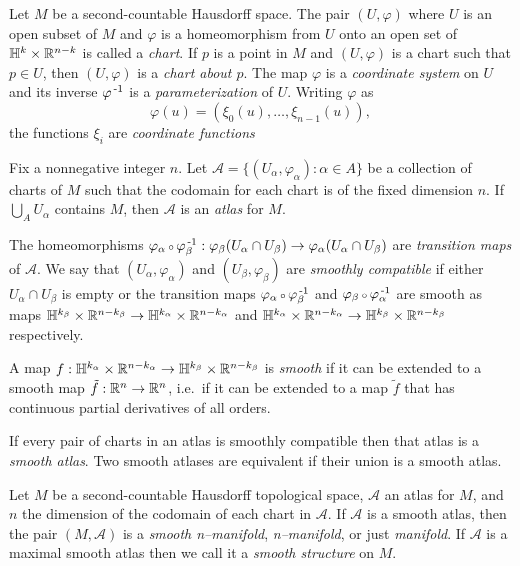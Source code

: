\begin{defn}[Coordinates]
	\label{def:coordinates}
	Let $M$ be a second-countable Hausdorff space.
	The pair $(U,\varphi)$ where $U$ is an open subset of $M$ and $\varphi$ is a homeomorphism from $U$ onto an open set of $\mathbb{H}^k\times\mathbb{R}^{n-k}$ is called a \emph{chart}.
	If $p$ is a point in $M$ and $(U,\varphi)$ is a chart such that $p\in U$, then $(U,\varphi)$ is a \emph{chart about $p$}.
	The map $\varphi$ is a \emph{coordinate system} on $U$ and its inverse $\varphi^{\,\text{-}1}$ is a \emph{parameterization} of $U$.
	Writing $\varphi$ as
	\[
		\varphi(u) = (\xi_0(u),\dots,\xi_{n-1}(u)),
	\]
	the functions $\xi_i$ are \emph{coordinate functions}	
\end{defn}

\begin{defn}[Atlas]
	\label{def:atlas}
	Fix a nonnegative integer $n$.
	Let $\mathcal{A}=\{(U_\alpha,\varphi_\alpha):\alpha\in A\}$ be a collection of charts of $M$ such that the codomain for each chart is of the fixed dimension $n$.
	If $\bigcup_A U_\alpha$ contains $M$, then $\mathcal{A}$ is an \emph{atlas} for $M$.
	
	The homeomorphisms $\varphi_\alpha\comp \varphi_\beta\inv:\varphi_\beta(U_\alpha\cap U_\beta)\to \varphi_\alpha(U_\alpha\cap U_\beta)$ are \emph{transition maps} of $\mathcal{A}$.
	We say that $(U_\alpha,\varphi_\alpha)$ and $(U_\beta,\varphi_\beta)$ are \emph{smoothly compatible} if either $U_\alpha\cap U_\beta$ is empty or the transition maps $\varphi_\alpha\comp \varphi_\beta\inv$ and $\varphi_\beta\comp \varphi_\alpha\inv$ are smooth as maps $\mathbb{H}^{k_\beta}\times\mathbb{R}^{n-k_\beta}\to\mathbb{H}^{k_\alpha}\times\mathbb{R}^{n-k_\alpha}$ and  $\mathbb{H}^{k_\alpha}\times\mathbb{R}^{n-k_\alpha}\to\mathbb{H}^{k_\beta}\times\mathbb{R}^{n-k_\beta}$ respectively.
	
	A map $f:\mathbb{H}^{k_\alpha}\times\mathbb{R}^{n-k_\alpha}\to\mathbb{H}^{k_\beta}\times\mathbb{R}^{n-k_\beta}$ is \emph{smooth} if it can be extended to a smooth map $\tilde{f}:\mathbb{R}^n\to\mathbb{R}^n$, i.e.\ if it can be extended to a map $\tilde{f}$ that has continuous partial derivatives of all orders.
	
	If every pair of charts in an atlas is smoothly compatible then that atlas is a \emph{smooth atlas}.
	Two smooth atlases are equivalent if their union is a smooth atlas.
\end{defn}

\begin{defn}[Manifold]
	\label{def:manifold}
	Let $M$ be a second-countable Hausdorff topological space, $\mathcal{A}$ an atlas for $M$, and $n$ the dimension of the codomain of each chart in $\mathcal{A}$.
	If $\mathcal{A}$ is a smooth atlas, then the pair $(M,\mathcal{A})$ is a \emph{smooth n--manifold},  \emph{n--manifold}, or just \emph{manifold}.
	If $\mathcal{A}$ is a maximal smooth atlas then we call it a \emph{smooth structure} on $M$.
\end{defn}

